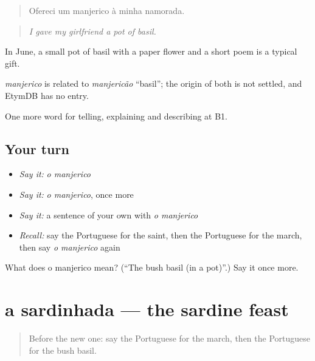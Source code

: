 \begin{quote}
Ofereci um manjerico à minha namorada.
\end{quote}

\begin{quote}
\emph{I gave my girlfriend a pot of basil.}
\end{quote}

In June, a small pot of basil with a paper flower and a short poem is a typical gift.

\begin{cousinweb}
\emph{manjerico} is related to \emph{manjericão} \textquotedblleft{}basil\textquotedblright{}; the origin of both is not settled, and EtymDB has no entry.
\end{cousinweb}

\begin{grammarlens}[title={What you've built}]
One more word for telling, explaining and describing at B1.
\end{grammarlens}

\subsection*{Your turn}
\begin{itemize}
\raggedright
  \item \emph{Say it:} \emph{o manjerico}
  \item \emph{Say it:} \emph{o manjerico}, once more
  \item \emph{Say it:} a sentence of your own with \emph{o manjerico}
  \item \emph{Recall:} say the Portuguese for the saint, then the Portuguese for the march, then say \emph{o manjerico} again
\end{itemize}

\begin{tcolorbox}[breakable,colback=teal!4,colframe=teal!35!black,title={Before you move on}]
What does o manjerico mean? (\textquotedblleft{}The bush basil (in a pot)\textquotedblright{}.) Say it once more.
\end{tcolorbox}
\section[a sardinhada]{a sardinhada — the sardine feast}

\label{lesson:PT-C319-sardinhada}



\begin{quote}
Before the new one: say the Portuguese for the march, then the Portuguese for the bush basil.
\end{quote}

